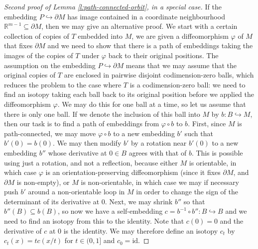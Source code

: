 \documentclass[reqno,a4paper]{article}
\numberwithin{equation}{section}
\theoremstyle{italicised}
\theoremstyle{upright}
\theoremstyle{italicised-restate}
\newcommand{\bR}{\mathbb{R}}
\begin{document}
\begin{proof}[Second proof of Lemma \ref{l:path-connected-orbit}, in a special case]
If the embedding $P \hookrightarrow \partial M$ has image contained in a coordinate neighbourhood $\bR^{m-1} \subseteq \partial M$, then we may give an alternative proof. We start with a certain collection of copies of $T$ embedded into $M$, we are given a diffeomorphism $\varphi$ of $M$ that fixes $\partial M$ and we need to show that there is a path of embeddings taking the images of the copies of $T$ under $\varphi$ back to their original positions. The assumption on the embedding $P \hookrightarrow \partial M$ means that we may assume that the original copies of $T$ are enclosed in pairwise disjoint codimension-zero balls, which reduces the problem to the case where $T$ is a codimension-zero ball: we need to find an isotopy taking each ball back to its original position before we applied the diffeomorphism $\varphi$. We may do this for one ball at a time, so let us assume that there is only one ball. If we denote the inclusion of this ball into $M$ by $b \colon B \hookrightarrow M$, then our task is to find a path of embeddings from $\varphi \circ b$ to $b$. First, since $M$ is path-connected, we may move $\varphi \circ b$ to a new embedding $b'$ such that $b'(0) = b(0)$. We may then modify $b'$ by a rotation near $b'(0)$ to a new embedding $b''$ whose derivative at $0 \in B$ agrees with that of $b$. This is possible using just a rotation, and not a reflection, because either $M$ is orientable, in which case $\varphi$ is an orientation-preserving diffeomorphism (since it fixes $\partial M$, and $\partial M$ is non-empty), or $M$ is non-orientable, in which case we may if necessary push $b'$ around a non-orientable loop in $M$ in order to change the sign of the determinant of its derivative at $0$. Next, we may shrink $b''$ so that $b''(B) \subseteq b(B)$, so now we have a self-embedding $c = b^{-1} \circ b'' \colon B \hookrightarrow B$ and we need to find an isotopy from this to the identity. Note that $c(0) = 0$ and the derivative of $c$ at $0$ is the identity. We may therefore define an isotopy $c_t$ by $c_t(x) = tc(x/t)$ for $t \in (0,1]$ and $c_0 = \mathrm{id}$.
\end{proof}
\end{document}
